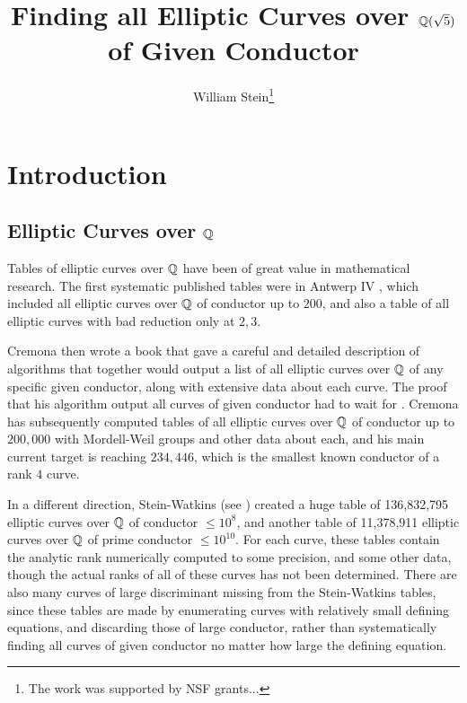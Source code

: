 \documentclass{article}
\title{Finding all Elliptic Curves over $\mathbb{Q}(\sqrt{5})$\\of Given Conductor}
\author{William Stein\footnote{The work was supported by NSF grants...}}
\begin{document}
\maketitle

\begin{abstract} 
\end{abstract}

\tableofcontents

\section{Introduction}\label{sec:intro}

\subsection{Elliptic Curves over $\mathbb{Q}$}
Tables of elliptic curves over $\mathbb{Q}$ have been of great value in
mathematical research.  The first systematic published tables were in
Antwerp IV \cite{antwerpiv}, which included all elliptic curves over
$\mathbb{Q}$ of conductor up to $200$, and also a table of all elliptic curves
with bad reduction only at $2,3$.

Cremona then wrote a book \cite{cremona:algs} that gave a careful and
detailed description of algorithms that together would
output a list of all elliptic curves over $\mathbb{Q}$ of any specific given
conductor, along with extensive data about each curve.  The proof that
his algorithm output all curves of given conductor had to wait for
\cite{breuil-conrad-diamond-taylor}.  Cremona has subsequently
computed tables \cite{cremona:onlinetables} of all elliptic curves
over $\mathbb{Q}$ of conductor up to $200,000$ with Mordell-Weil groups and
other data about each, and his main current target is reaching
$234,446$, which is the smallest known conductor of a rank $4$ curve.

In a different direction, Stein-Watkins (see
\cite{stein-watkins:ants5, bmsw:bulletins}) created a huge table of
136,832,795 elliptic curves over $\mathbb{Q}$ of conductor $\leq 10^8$, and
another table of 11,378,911 elliptic curves over $\mathbb{Q}$ of prime
conductor $\leq 10^{10}$.  For each curve, these tables contain the
analytic rank numerically computed to some precision, and some other
data, though the actual ranks of all of these curves has not been
determined.  There are also many curves of large discriminant missing
from the Stein-Watkins tables, since these tables are made by
enumerating curves with relatively small defining equations, and
discarding those of large conductor, rather than systematically
finding all curves of given conductor no matter how large the defining
equation.
 
\end{document}
